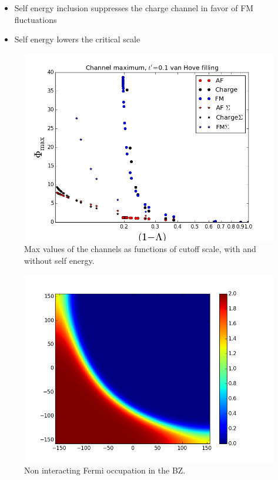 \begin{itemize}

\item Self energy inclusion suppresses the charge channel in favor of FM fluctuations

\item Self energy lowers the critical scale

\end{itemize}

\begin{figure}
\includegraphics[scale=0.5]{images/sevsnose.png}
\caption{Max values of the channels as functions of cutoff scale, with and without self energy. }
 \end{figure}
 
 \begin{figure}
 \includegraphics[scale=0.5]{images/Fermi_occupation_nose.png}
 \caption{Non interacting Fermi occupation in the BZ. }
 \end{figure}
 
